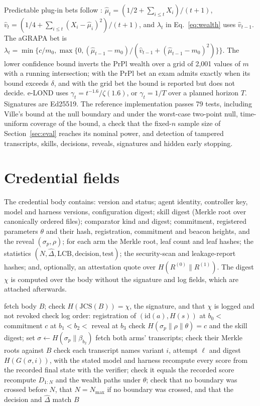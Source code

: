 Predictable plug-in bets follow \citet{waudbysmith2024betting}: $\hat\mu_t=(1/2+\sum_{i\le t}X_i)/(t+1)$, $\hat v_t=(1/4+\sum_{i\le t}(X_i-\hat\mu_i)^2)/(t+1)$, and $\lambda_t$ in Eq.~\eqref{eq:wealth} uses $\hat v_{t-1}$. The aGRAPA bet is $\lambda_t=\min\{c/m_0,\max\{0,(\hat\mu_{t-1}-m_0)/(\hat v_{t-1}+(\hat\mu_{t-1}-m_0)^2)\}\}$. The lower confidence bound inverts the PrPl wealth over a grid of 2{,}001 values of $m$ with a running intersection; with the PrPl bet an exam admits exactly when its bound exceeds $\delta$, and with the grid bet the bound is reported but does not decide. e-LOND uses $\gamma_t=t^{-1.6}/\zeta(1.6)$, or $\gamma_t=1/T$ over a planned horizon $T$. Signatures are Ed25519. The reference implementation passes 79 tests, including Ville's bound at the null boundary and under the worst-case two-point null, time-uniform coverage of the bound, a check that the fixed-$n$ sample size of Section~\ref{sec:eval} reaches its nominal power, and detection of tampered transcripts, skills, decisions, reveals, signatures and hidden early stopping.

\section{Credential fields}
\label{app:schema}
The credential body contains: version and status; agent identity, controller key, model and harness versions, configuration digest; skill digest (Merkle root over canonically ordered files); comparator kind and digest; commitment, registered parameters $\theta$ and their hash, registration, commitment and beacon heights, and the reveal $(\sigma_p,\rho)$; for each arm the Merkle root, leaf count and leaf hashes; the statistics $(N,\hat\Delta,\mathrm{LCB},\text{decision},\text{test})$; the security-scan and leakage-report hashes; and, optionally, an attestation quote over $H(R^{(0)}\|R^{(1)})$. The digest $\chi$ is computed over the body without the signature and log fields, which are attached afterwards.

\begin{algorithm}[H]
\caption{VerifyCredential$(\chi)$}\label{alg:verify}
\begin{algorithmic}[1]
\State fetch body $B$; check $H(\mathrm{JCS}(B))=\chi$, the signature, and that $\chi$ is logged and not revoked
\State check log order: registration of $(\mathrm{id}(a),H(s))$ at $b_0<$ commitment $c$ at $b_1<b_2<$ reveal at $b_3$
\State check $H(\sigma_p\|\rho\|\theta)=c$ and the skill digest; set $\sigma\gets H(\sigma_p\|\beta_{b_2})$
\State fetch both arms' transcripts; check their Merkle roots against $B$
\State check each transcript names variant $i$, attempt $\ell$ and digest $H(G(\sigma,i))$, with the stated model and harness
\State recompute every score from the recorded final state with the verifier; check it equals the recorded score
\EndFor
\State recompute $D_{1:N}$ and the wealth paths under $\theta$; check that no boundary was crossed before $N$, that $N=N_{\max}$ if no boundary was crossed, and that the decision and $\hat\Delta$ match $B$
\end{algorithmic}
\end{algorithm}

